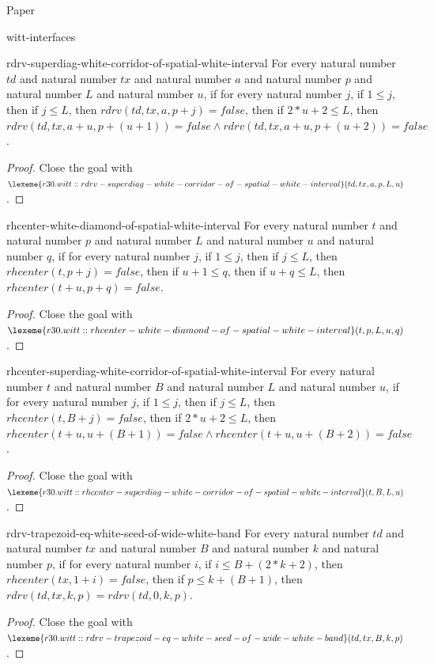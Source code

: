 \begin{lexlean}{Paper}
\begin{section}{witt-interfaces}
  \begin{theorem}{rdrv-superdiag-white-corridor-of-spatial-white-interval}
  For every natural number \(td\) and natural number \(tx\) and natural number \(a\) and natural number \(p\) and natural number \(L\) and natural number \(u\), if for every natural number \(j\), if \(1 ≤ j\), then if \(j ≤ L\), then \(rdrv(td, tx, a, p + j) = false\), then if \(2 * u + 2 ≤ L\), then \(rdrv(td, tx, a + u, p + (u + 1)) = false ∧ rdrv(td, tx, a + u, p + (u + 2)) = false\).
  \begin{proof}
  Close the goal with \(\lexeme{r30.witt::rdrv-superdiag-white-corridor-of-spatial-white-interval}(td, tx, a, p, L, u)\).
  \end{proof}
  \end{theorem}

  \begin{theorem}{rhcenter-white-diamond-of-spatial-white-interval}
  For every natural number \(t\) and natural number \(p\) and natural number \(L\) and natural number \(u\) and natural number \(q\), if for every natural number \(j\), if \(1 ≤ j\), then if \(j ≤ L\), then \(rhcenter(t, p + j) = false\), then if \(u + 1 ≤ q\), then if \(u + q ≤ L\), then \(rhcenter(t + u, p + q) = false\).
  \begin{proof}
  Close the goal with \(\lexeme{r30.witt::rhcenter-white-diamond-of-spatial-white-interval}(t, p, L, u, q)\).
  \end{proof}
  \end{theorem}

  \begin{theorem}{rhcenter-superdiag-white-corridor-of-spatial-white-interval}
  For every natural number \(t\) and natural number \(B\) and natural number \(L\) and natural number \(u\), if for every natural number \(j\), if \(1 ≤ j\), then if \(j ≤ L\), then \(rhcenter(t, B + j) = false\), then if \(2 * u + 2 ≤ L\), then \(rhcenter(t + u, u + (B + 1)) = false ∧ rhcenter(t + u, u + (B + 2)) = false\).
  \begin{proof}
  Close the goal with \(\lexeme{r30.witt::rhcenter-superdiag-white-corridor-of-spatial-white-interval}(t, B, L, u)\).
  \end{proof}
  \end{theorem}

  \begin{theorem}{rdrv-trapezoid-eq-white-seed-of-wide-white-band}
  For every natural number \(td\) and natural number \(tx\) and natural number \(B\) and natural number \(k\) and natural number \(p\), if for every natural number \(i\), if \(i ≤ B + (2 * k + 2)\), then \(rhcenter(tx, 1 + i) = false\), then if \(p ≤ k + (B + 1)\), then \(rdrv(td, tx, k, p) = rdrv(td, 0, k, p)\).
  \begin{proof}
  Close the goal with \(\lexeme{r30.witt::rdrv-trapezoid-eq-white-seed-of-wide-white-band}(td, tx, B, k, p)\).
  \end{proof}
  \end{theorem}


\end{section}
\end{lexlean}
